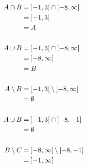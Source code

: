 \documentclass{article}
\begin{document}
\begin{align*}
  A \cap B &= \interval[open]{-1}{3} \cap \interval[open]{-8}{\infty} \\
           &= \interval[open]{-1}{3} \\
           &= A \\
  \\
  A \cup B &= \interval[open]{-1}{3} \cap \interval[open]{-8}{\infty} \\
           &= \interval[open]{-8}{\infty} \\
           &= B \\
  \\
  A \setminus B &= \interval[open]{-1}{3} \setminus \interval[open]{-8}{\infty} \\
           &= \emptyset \\
  \\
  A \cup B &= \interval[open]{-1}{3} \cap \interval[open left]{-8}{-1} \\
           &= \emptyset \\
  \\
  B \setminus C &= \interval[open]{-8}{\infty} \setminus \interval[open left]{-8}{-1} \\
           &= \interval[open]{-1}{\infty} \\
\end{align*}
\end{document}
